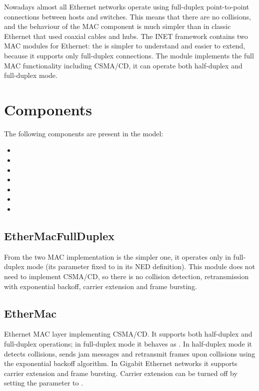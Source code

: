 Nowadays almost all Ethernet networks operate using full-duplex
point-to-point connections between hosts and switches. This means
that there are no collisions, and the behaviour of the MAC component
is much simpler than in classic Ethernet that used coaxial cables and
hubs. The INET framework contains two MAC modules for Ethernet:
the  is simpler to understand and easier to extend,
because it supports only full-duplex connections. The 
module implements the full MAC functionality including CSMA/CD, it
can operate both half-duplex and full-duplex mode.

\section{Components}
\label{sec:ethernet:components}

The following components are present in the model:

\begin{itemize}
  \item {}
  \item {}
  \item {}
  \item {}
  \item {}
  \item {}
  \item {}
\end{itemize}


\subsection{EtherMacFullDuplex}
\label{sec:ethernet:ethermacfullduplex}

From the two MAC implementation  is the simpler one,
it operates only in full-duplex mode (its  parameter fixed to
 in its NED definition). This module does not need to implement
CSMA/CD, so there is no collision detection, retransmission with exponential backoff,
carrier extension and frame bursting.

\subsection{EtherMac}
\label{sec:ethernet:ethermac}

Ethernet MAC layer implementing CSMA/CD. It supports both half-duplex and full-duplex operations;
in full-duplex mode it behaves as . In half-duplex mode
it detects collisions, sends jam messages and retransmit frames upon collisions using
the exponential backoff algorithm. In Gigabit Ethernet networks it supports carrier
extension and frame bursting. Carrier extension can be turned off by setting the
 parameter to .

